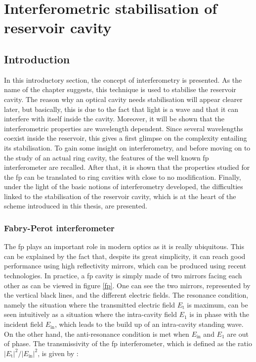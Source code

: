 \chapter{Interferometric stabilisation of reservoir cavity}

\label{ch-stabilisation}


\section{Introduction}

In this introductory section, the concept of interferometry is presented. As the name of the chapter suggests, this technique is used to stabilise the reservoir cavity. The reason why an optical cavity needs stabilisation will appear clearer later, but basically, this is due to the fact that light is a wave and that it can interfere with itself inside the cavity. Moreover, it will be shown that the interferometric properties are wavelength dependent. Since several wavelengths coexist inside the reservoir, this gives a first glimpse on the complexity entailing its stabilisation. To gain some insight on interferometry, and before moving on to the study of an actual ring cavity, the features of the well known \gls{fp} interferometer are recalled. After that, it is shown that the properties studied for the \gls{fp} can be translated to ring cavities with close to no modification. Finally, under the light of the basic notions of interferometry developed, the difficulties linked to the stabilisation of the reservoir cavity, which is at the heart of the scheme introduced in this thesis, are presented.


\subsection{Fabry-Perot interferometer}

The \gls{fp} plays an important role in modern optics as it is really ubiquitous. This can be explained by the fact that, despite its great simplicity, it can reach good performance using high reflectivity mirrors, which can be produced using recent technologies. In practice, a \gls{fp} cavity is simply made of two mirrors facing each other as can be viewed in figure \ref{fp}. One can see the two mirrors, represented by the vertical black lines, and the different electric fields. The resonance condition, namely the situation where the transmitted electric field $E_{\text{t}}$ is maximum, can be seen intuitively as a situation where the intra-cavity field $E_1$ is in phase with the incident field $E_{\text{in}}$, which leads to the build up of an intra-cavity standing wave. On the other hand, the anti-resonance condition is met when $E_{\text{in}}$ and $E_1$ are out of phase. The transmissivity of the \gls{fp} interferometer, which is defined as the ratio $|E_{\text{t}}|^2/|E_{\text{in}}|^2$, is given by \cite{Perot1899}:

